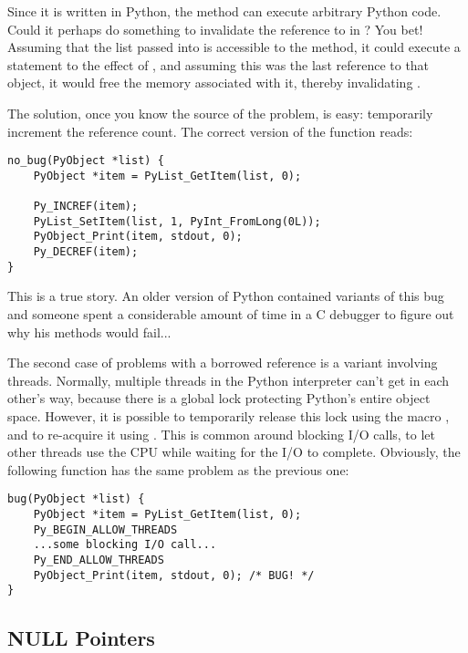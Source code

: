 \documentclass{manual}
\begin{document}
Since it is written in Python, the  method can execute
arbitrary Python code.  Could it perhaps do something to invalidate
the reference to  in ?  You bet!  Assuming
that the list passed into  is accessible to the
 method, it could execute a statement to the effect of
, and assuming this was the last reference to that
object, it would free the memory associated with it, thereby
invalidating .

The solution, once you know the source of the problem, is easy:
temporarily increment the reference count.  The correct version of the
function reads:

\begin{verbatim}
no_bug(PyObject *list) {
    PyObject *item = PyList_GetItem(list, 0);

    Py_INCREF(item);
    PyList_SetItem(list, 1, PyInt_FromLong(0L));
    PyObject_Print(item, stdout, 0);
    Py_DECREF(item);
}
\end{verbatim}

This is a true story.  An older version of Python contained variants
of this bug and someone spent a considerable amount of time in a C
debugger to figure out why his  methods would fail...

The second case of problems with a borrowed reference is a variant
involving threads.  Normally, multiple threads in the Python
interpreter can't get in each other's way, because there is a global
lock protecting Python's entire object space.  However, it is possible
to temporarily release this lock using the macro
, and to re-acquire it using
.  This is common around blocking I/O
calls, to let other threads use the CPU while waiting for the I/O to
complete.  Obviously, the following function has the same problem as
the previous one:

\begin{verbatim}
bug(PyObject *list) {
    PyObject *item = PyList_GetItem(list, 0);
    Py_BEGIN_ALLOW_THREADS
    ...some blocking I/O call...
    Py_END_ALLOW_THREADS
    PyObject_Print(item, stdout, 0); /* BUG! */
}
\end{verbatim}


\subsection{NULL Pointers
            \label{nullPointers}}
\end{document}
